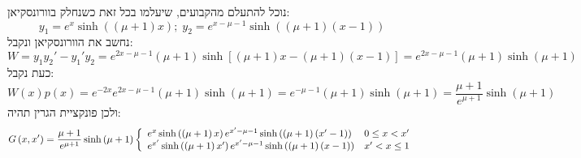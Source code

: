 \documentclass{tstextbook}
\begin{document}
נוכל להתעלם מהקבועים, שיעלמו בכל זאת כשנחלק בוורונסקיאן:
$$y_{1}=e^{x}\sinh\left(\left(\mu+1\right)x\right);\;y_{2}=e^{x-\mu-1}\sinh\left(\left(\mu+1\right)\left(x-1\right)\right)$$
נחשב את הוורונסקיאן ונקבל:
$$W=y_{1}y_{2}'-y_{1}'y_{2}=\!e^{2x-\mu-1}\left(\mu+1\right)\sinh\left[\left(\mu+1\right)x-\left(\mu+1\right)\left(x-1\right)\right]=e^{2x-\mu-1}\left(\mu+1\right)\sinh\left(\mu+1\right)$$
כעת נקבל:
$$W\left(x\right)p\left(x\right)=e^{-2x}e^{2x-\mu-1}\left(\mu+1\right)\sinh\left(\mu+1\right)=e^{-\mu-1}\left(\mu+1\right)\sinh\left(\mu+1\right)=\frac{\mu+1}{e^{\mu+1}}\sinh\left(\mu+1\right)$$
ולכן פונקציית הגרין תהיה:
$$G\left(x,x^{\prime}\right)={\frac{\mu+1}{e^{\mu+1}}}\sinh\left(\mu+1\right)\left\{{\begin{array}{l l}{e^{x}\sinh\left(\left(\mu+1\right)x\right)e^{x^{\prime}-\mu-1}\sinh\left(\left(\mu+1\right)\left(x^{\prime}-1\right)\right)}&{0\leq x<x^{\prime}}\\ {e^{x^{\prime}}\sinh\left(\left(\mu+1\right)x^{\prime}\right)e^{x^{\prime}-\mu-1}\sinh\left(\left(\mu+1\right)\left(x-1\right)\right)}&{x^{\prime}<x\leq1}\end{array}}\right.$$
\end{document}
